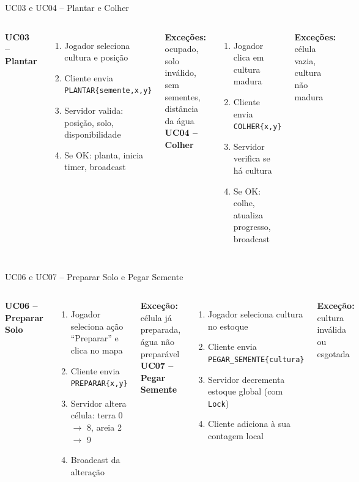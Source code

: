 \documentclass[aspectratio=169]{beamer}
\begin{document}
\begin{frame}{UC03 e UC04 -- Plantar e Colher}
  \begin{columns}
    \textbf{UC03 -- Plantar}
    \begin{enumerate}
      \item Jogador seleciona cultura e posi\c{c}\~ao
      \item Cliente envia \texttt{PLANTAR\{semente,x,y\}}
      \item Servidor valida: posi\c{c}\~ao, solo, disponibilidade
      \item Se OK: planta, inicia timer, broadcast
    \end{enumerate}
    \textbf{Exce\c{c}\~oes:} ocupado, solo inv\'alido, sem sementes, dist\^ancia da \'agua
    \textbf{UC04 -- Colher}
    \begin{enumerate}
      \item Jogador clica em cultura madura
      \item Cliente envia \texttt{COLHER\{x,y\}}
      \item Servidor verifica se h\'a cultura
      \item Se OK: colhe, atualiza progresso, broadcast
    \end{enumerate}
    \textbf{Exce\c{c}\~oes:} c\'elula vazia, cultura n\~ao madura
  \end{columns}
\end{frame}

\begin{frame}{UC06 e UC07 -- Preparar Solo e Pegar Semente}
  \begin{columns}
    \textbf{UC06 -- Preparar Solo}
    \begin{enumerate}
      \item Jogador seleciona a\c{c}\~ao ``Preparar'' e clica no mapa
      \item Cliente envia \texttt{PREPARAR\{x,y\}}
      \item Servidor altera c\'elula: terra 0 $\rightarrow$ 8, areia 2 $\rightarrow$ 9
      \item Broadcast da altera\c{c}\~ao
    \end{enumerate}
    \textbf{Exce\c{c}\~ao:} c\'elula j\'a preparada, \'agua n\~ao prepar\'avel
    \textbf{UC07 -- Pegar Semente}
    \begin{enumerate}
      \item Jogador seleciona cultura no estoque
      \item Cliente envia \texttt{PEGAR\_SEMENTE\{cultura\}}
      \item Servidor decrementa estoque global (com \texttt{Lock})
      \item Cliente adiciona \`a sua contagem local
    \end{enumerate}
    \textbf{Exce\c{c}\~ao:} cultura inv\'alida ou esgotada
  \end{columns}
\end{frame}
\end{document}
